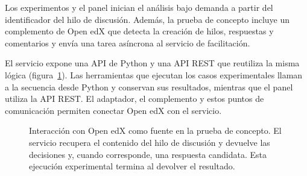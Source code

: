 Los experimentos y el panel inician el análisis bajo demanda a partir del identificador del hilo de discusión. Además, la prueba de concepto incluye un complemento de Open edX que detecta la creación de hilos, respuestas y comentarios y envía una tarea asíncrona al servicio de facilitación.

El servicio expone una API de Python y una API REST que reutiliza la misma lógica (figura~\ref{fig:activacion-bajo-demanda}). Las herramientas que ejecutan los casos experimentales llaman a la secuencia desde Python y conservan sus resultados, mientras que el panel utiliza la API REST. El adaptador, el complemento y estos puntos de comunicación permiten conectar Open edX con el servicio.

\begin{figure}[htbp]
\centering
{}
\caption{Interacción con Open edX como fuente en la prueba de concepto. El servicio recupera el contenido del hilo de discusión y devuelve las decisiones y, cuando corresponde, una respuesta candidata. Esta ejecución experimental termina al devolver el resultado.}
\label{fig:activacion-bajo-demanda}
\end{figure}

